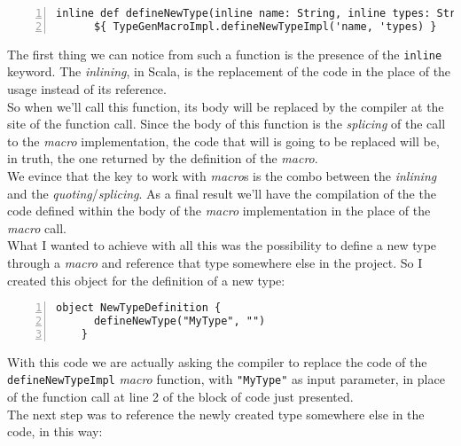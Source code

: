 \begin{minipage}{\linewidth}
  \begin{lstlisting}[numbers=left, numberstyle=\tiny, numbersep=-5pt, stepnumber=1]
    inline def defineNewType(inline name: String, inline types: String*): Any = 
      ${ TypeGenMacroImpl.defineNewTypeImpl('name, 'types) }
  \end{lstlisting}
\end{minipage}
The first thing we can notice from such a function is the presence of the \texttt{inline} keyword.
The \textit{inlining}, in Scala, is the replacement of the code in the place of the usage instead of its reference.\\
So when we'll call this function, its body will be replaced by the compiler at the site of the function call.
Since the body of this function is the \textit{splicing} of the call to the \textit{macro} implementation, the code that will is going to be replaced will be, in truth, the one returned by the definition of the \textit{macro}.\\
We evince that the key to work with \textit{macro}s is the combo between the \textit{inlining} and the \textit{quoting}/\textit{splicing}.
As a final result we'll have the compilation of the the code defined within the body of the \textit{macro} implementation in the place of the \textit{macro} call.\\
\newline
What I wanted to achieve with all this was the possibility to define a new type through a \textit{macro} and reference that type somewhere else in the project.
So I created this object for the definition of a new type:\\
\begin{minipage}{\linewidth}
  \begin{lstlisting}[numbers=left, numberstyle=\tiny, numbersep=-5pt, stepnumber=1]
    object NewTypeDefinition {
      defineNewType("MyType", "")
    }
  \end{lstlisting}
\end{minipage}
With this code we are actually asking the compiler to replace the code of the \texttt{defineNewTypeImpl} \textit{macro} function, with \texttt{"MyType"} as input parameter, in place of the function call at line 2 of the block of code just presented.\\
The next step was to reference the newly created type somewhere else in the code, in this way:\\
